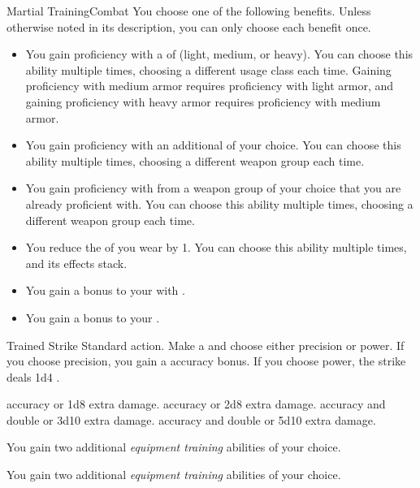     \begin{feat}{Martial Training}{Combat}
         You choose one of the following benefits.
        Unless otherwise noted in its description, you can only choose each benefit once.
        \begin{itemize}
            \item You gain proficiency with a  of  (light, medium, or heavy).
                You can choose this ability multiple times, choosing a different usage class each time.
                Gaining proficiency with medium armor requires proficiency with light armor, and gaining proficiency with heavy armor requires proficiency with medium armor.
            \item You gain proficiency with an additional  of your choice.
                You can choose this ability multiple times, choosing a different weapon group each time.
            \item You gain proficiency with  from a weapon group of your choice that you are already proficient with.
                You can choose this ability multiple times, choosing a different weapon group each time.
            \item You reduce the  of  you wear by 1.
                You can choose this ability multiple times, and its effects stack.
            \item You gain a  bonus to your  with .
            \item You gain a  bonus to your .
        \end{itemize}

        \begin{activeability}{Trained Strike}
            \abilityusagetime Standard action.
            \rankline
            Make a  and choose either precision or power.
            If you choose precision, you gain a  accuracy bonus.
            If you choose power, the strike deals 1d4 .

            \rankline
              accuracy or 1d8 extra damage.
              accuracy or 2d8 extra damage.
              accuracy and double  or 3d10 extra damage.
              accuracy and double  or 5d10 extra damage.
        \end{activeability}

         You gain two additional \textit{equipment training} abilities of your choice.

         You gain two additional \textit{equipment training} abilities of your choice.
    \end{feat}

